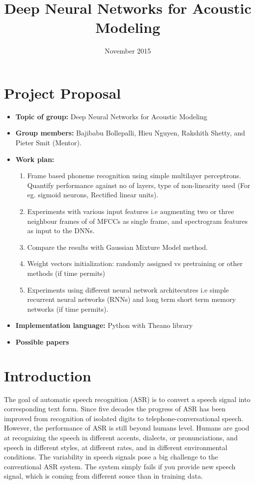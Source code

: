 \documentclass{article}
\title{Deep Neural Networks for Acoustic Modeling}
\author{}
\date{November 2015}
\begin{document}
\maketitle

\section{Project Proposal}
\begin{itemize}
 \item \textbf{Topic of group:} Deep Neural Networks for Acoustic Modeling
 \item \textbf{Group members:} Bajibabu Bollepalli,  Hieu Nguyen,  Rakshith Shetty, and Pieter Smit (Mentor).
 \item \textbf{Work plan:}
   \begin{enumerate}
   \item Frame based phoneme recognition using simple multilayer perceptrons. Quantify performance against no of layers, type of non-linearity used (For eg. sigmoid neurons, Rectified linear units).
   \item Experiments with various input features i.e augmenting two or three neighbour frames of of MFCCs as single frame, and spectrogram features as input to the DNNs.
   \item Compare the results with Gaussian Mixture Model method.
   \item Weight vectors initialization: randomly assigned vs pretraining or other methods (if time permits)
   \item Experiments using different neural network architecutres i.e simple recurrent neural networks (RNNs) and long term short term memory networks (if time permits).
   \end{enumerate}
 \item \textbf{Implementation language:} Python with Theano library
 \item \textbf{Possible papers}
 \citep{Hinton2012, Alex2013, Mohamed2012}
\end{itemize}


\section{Introduction}
The goal of automatic speech recognition (ASR) is to convert a speech signal into corresponding text form. Since five decades the progress of ASR has been improved from recognition of isolated digits to telephone-conversational speech. However, the performance of ASR is still beyond humans level. Humans are good at recognizing the speech in different accents, dialects, or pronunciations, and speech in different styles, at different rates, and in different environmental conditions. The variability in speech signals pose a big challenge to the conventional ASR system. The system simply fails if you provide new speech signal, which is coming from different souce than in training data. 
\end{document}
